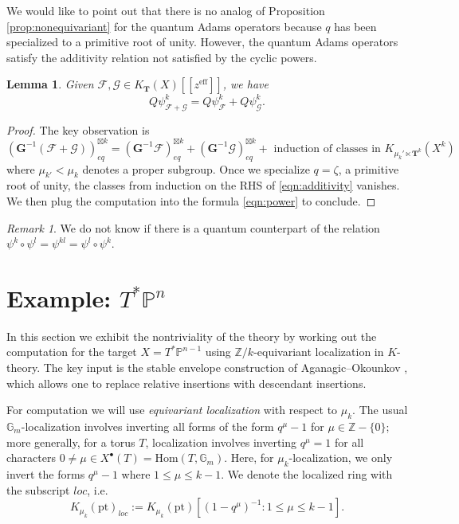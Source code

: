 \documentclass[reqno]{amsart}
\numberwithin{equation}{section}
\numberwithin{equation}{section}
\numberwithin{equation}{section}
\newtheorem{lemma}[thm]{Lemma}
\theoremstyle{definition}
\theoremstyle{remark}
\theoremstyle{remark}
\newtheorem{rem}[thm]{Remark}
\begin{document}
We would like to point out that there is no analog of Proposition \eqref{prop:nonequivariant} for the quantum Adams operators because $q$ has been specialized to a primitive root of unity. However, the quantum Adams operators satisfy the additivity relation not satisfied by the cyclic powers.

\begin{lemma}\label{lem:qadams-additivity}
    Given $\mathcal{F}, \mathcal{G} \in K_{\mathbf{T}}(X)[\![ z^{\mathrm{eff}} ]\!]$, we have
    \begin{equation}
        Q\psi_{\mathcal{F}+\mathcal{G}}^k = Q\psi_{\mathcal{F}}^k + Q\psi_{\mathcal{G}}^k.
    \end{equation}
\end{lemma}
\begin{proof}
    The key observation is
    \begin{equation}\label{eqn:additivity}
        (\mathbf{G}^{-1}(\mathcal{F} + \mathcal{G}))^{\boxtimes k}_{eq} = (\mathbf{G}^{-1}\mathcal{F})^{\boxtimes k}_{eq} + (\mathbf{G}^{-1}\mathcal{G})^{\boxtimes k}_{eq} + \text{ induction of classes in } K_{\mu_k' \ltimes \mathbf{T}^k}(X^k)
    \end{equation}
    where $\mu_{k'} < \mu_k$ denotes a proper subgroup. Once we specialize $q = \zeta$, a primitive root of unity, the classes from induction on the RHS of \eqref{eqn:additivity} vanishes. We then plug the computation into the formula \eqref{eqn:power} to conclude. 
\end{proof}

\begin{rem}
    We do not know if there is a quantum counterpart of the relation $\psi^k \circ \psi^l = \psi^{kl} = \psi^{l} \circ \psi^{k}$.
\end{rem}

\section{Example: $T^*\mathbb{P}^{n}$}\label{ssec:oper-example}
In this section we exhibit the nontriviality of the theory by working out the computation for the target $X = T^*\mathbb{P}^{n-1}$ using $\mathbb{Z}/k$-equivariant localization in $K$-theory. The key input is the stable envelope construction of Aganagic--Okounkov \cite{aganagic-okounkov-bethe}, which allows one to replace relative insertions with descendant insertions.

For computation we will use \emph{equivariant localization} with respect to $\mu_k$. The usual $\mathbb{G}_m$-localization involves inverting all forms of the form $q^\mu - 1$ for $\mu \in \mathbb{Z} - \{0\}$; more generally, for a torus $T$, localization involves inverting $q^\mu =1$ for all characters $0 \neq \mu \in X^\bullet(T)= \mathrm{Hom}(T, \mathbb{G}_m)$. Here, for $\mu_k$-localization, we only invert the forms $q^\mu - 1$ where $1 \le \mu \le k-1$. We denote the localized ring with the subscript $loc$, i.e.
\begin{equation}
    K_{\mu_k}(\mathrm{pt})_{loc} := K_{\mu_k}(\mathrm{pt}) [ (1-q^\mu)^{-1} : 1 \le \mu \le k-1].
\end{equation}
\end{document}
